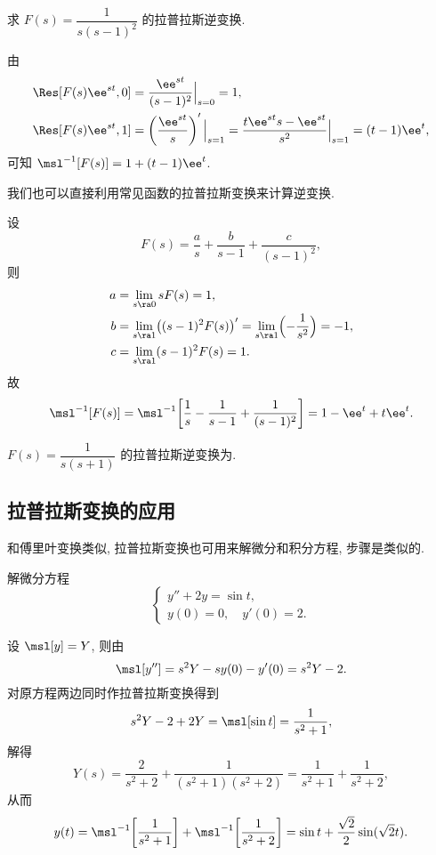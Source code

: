 \begin{example}
  求 $F(s)=\dfrac1{s(s-1)^2}$ 的拉普拉斯逆变换.
\end{example}

\begin{solution}[解法一]
  由
  \begin{align*}
     \Res[F(s)\ee^{st},0]
    &=\frac{\ee^{st}}{(s-1)^2}\Big|_{s=0}
     =1,\\
     \Res[F(s)\ee^{st},1]
    &=\left(\frac{\ee^{st}}s\right)'\Big|_{s=1}
     =\frac{t\ee^{st}s-\ee^{st}}{s^2}\Big|_{s=1}
     =(t-1)\ee^t,
  \end{align*}
  可知 $\msl^{-1}[F(s)]=1+(t-1)\ee^t$.
\end{solution}

我们也可以直接利用常见函数的拉普拉斯变换来计算逆变换.

\begin{solution}[解法二]
  设
  \[
    F(s)=\frac as+\frac b{s-1}+\frac c{(s-1)^2},
  \]
  则
  \begin{align*}
    a&=\lim_{s\ra0}sF(s)
      =1,\\
    b&=\lim_{s\ra1}\bigl((s-1)^2F(s)\bigr)'
      =\lim_{s\ra1}\Bigl(-\frac1{s^2}\Bigr)
      =-1,\\
    c&=\lim_{s\ra1}(s-1)^2F(s)
      =1.
  \end{align*}
  故
  \[
     \msl^{-1}[F(s)]
    =\msl^{-1}\biggl[\frac1s-\frac1{s-1}+\frac1{(s-1)^2}\biggr]
    =1-\ee^t+t\ee^t.
  \]
\end{solution}

\begin{exercise}
  $F(s)=\dfrac1{s(s+1)}$ 的拉普拉斯逆变换为\fillblank{}.
\end{exercise}



\subsection{拉普拉斯变换的应用}

和傅里叶变换类似, 拉普拉斯变换也可用来解微分和积分方程, 步骤是类似的.

\begin{example}
  解微分方程
  \[
    \begin{cases}
      y''+2y=\sin t,\\
      y(0)=0,\quad y'(0)=2.
    \end{cases}
  \]
\end{example}

\begin{solution}
  设 $\msl[y]=Y$, 则由\thmLDif
  \[
     \msl[y'']
    =s^2Y-sy(0)-y'(0)
    =s^2Y-2.
  \]
  对原方程两边同时作拉普拉斯变换得到
  \[
     s^2Y-2+2Y
    =\msl[\sin t]
    =\frac{1}{s^2+1},
  \]
  解得
  \[
     Y(s)
    =\frac{2}{s^2+2}+\frac{1}{(s^2+1)(s^2+2)}
    =\frac{1}{s^2+1}+\frac{1}{s^2+2},
  \]
  从而
  \[
     y(t)
    =\msl^{-1}\biggl[\frac{1}{s^2+1}\biggr]+\msl^{-1}\biggl[\frac{1}{s^2+2}\biggr]
    =\sin t+\frac{\sqrt 2}2\sin(\sqrt 2 t).
  \]
\end{solution}

